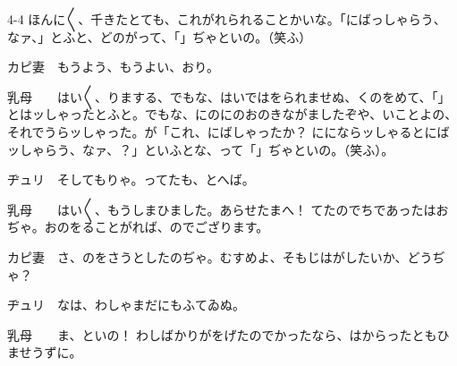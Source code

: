 \documentclass[tate,paper=b6j,jafontsize=9pt]{jlreq}
\begin{document}
\begin{azconvIndented}{4\zw}{-4\zw}
ほんに{〳〵}、千きたとても、これがれられることかいな。「にばっしゃらう、なァ、」とふと、どのがって、「」ぢゃといの。（笑ふ）

カピ妻　もうよう、もうよい、おり。

乳母　　はい{〳〵}、りまする、でもな、はいではをられませぬ、くのをめて、「」とはッしゃったとふと。でもな、にのにのおのきながましたぞや、いことよの、それでうらッしゃった。が「これ、にばしゃったか？ ににならッしゃるとにばッしゃらう、なァ、？」といふとな、って「」ぢゃといの。（笑ふ）。

ヂュリ　そしてもりゃ。ってたも、とへば。

乳母　　はい{〳〵}、もうしまひました。あらせたまへ！ てたのでちであったはおぢゃ。おのをることがれば、のでござります。

カピ妻　さ、のをさうとしたのぢゃ。むすめよ、そもじはがしたいか、どうぢゃ？

ヂュリ　なは、わしゃまだにもふてゐぬ。

乳母　　ま、といの！ わしばかりがをげたのでかったなら、はからったともひませうずに。


\end{azconvIndented}
\end{document}
